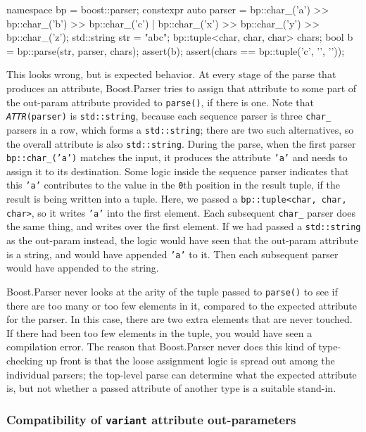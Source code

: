 \begin{code}
namespace bp = boost::parser;
constexpr auto parser = bp::char_('a') >> bp::char_('b') >> bp::char_('c') |
                        bp::char_('x') >> bp::char_('y') >> bp::char_('z');
std::string str = "abc";
bp::tuple<char, char, char> chars;
bool b = bp::parse(str, parser, chars);
assert(b);
assert(chars == bp::tuple('c', '\0', '\0'));
\end{code}

This looks wrong, but is expected behavior. At every stage of the parse that produces an attribute, Boost.Parser tries to assign that attribute to some part of the out-param attribute provided to \texttt{parse()}, if there is one. Note that \emph{\texttt{ATTR}}\texttt{(parser)} is \texttt{std::string}, because each sequence parser is three \texttt{char\_} parsers in a row, which forms a \texttt{std::string}; there are two such alternatives, so the overall attribute is also \texttt{std::string}. During the parse, when the first parser \texttt{bp::char\_('a')} matches the input, it produces the attribute \texttt{'a'} and needs to assign it to its destination. Some logic inside the sequence parser indicates that this \texttt{'a'} contributes to the value in the \texttt{0}th position in the result tuple, if the result is being written into a tuple. Here, we passed a \texttt{bp::tuple<char, char, char>}, so it writes \texttt{'a'} into the first element. Each subsequent \texttt{char\_} parser does the same thing, and writes over the first element. If we had passed a \texttt{std::string} as the out-param instead, the logic would have seen that the out-param attribute is a string, and would have appended \texttt{'a'} to it. Then each subsequent parser would have appended to the string.

Boost.Parser never looks at the arity of the tuple passed to \texttt{parse()} to see if there are too many or too few elements in it, compared to the expected attribute for the parser. In this case, there are two extra elements that are never touched. If there had been too few elements in the tuple, you would have seen a compilation error. The reason that Boost.Parser never does this kind of type-checking up front is that the loose assignment logic is spread out among the individual parsers; the top-level parse can determine what the expected attribute is, but not whether a passed attribute of another type is a suitable stand-in.

\subsubsection{\texorpdfstring{Compatibility of \texttt{variant} attribute out-parameters}{Compatibility of variant attribute out-parameters}}

